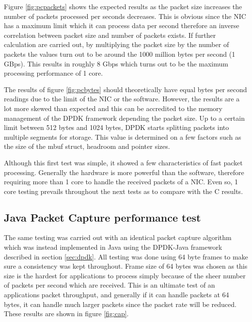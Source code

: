 \documentclass[final_report.tex]{subfiles}
\begin{document}
Figure \ref{fig:pcpackets} shows the expected results as the packet size increases the number of packets processed per seconds decreases. This is obvious since the NIC has a maximum limit which it can process data per second therefore an inverse correlation between packet size and number of packets exists. If further calculation are carried out, by multiplying the packet size by the number of packets the values turn out to be around the 1000 million bytes per second (1 GBps). This results in roughly 8 Gbps which turns out to be the maximum processing performance of 1 core.

The results of figure \ref{fig:pcbytes} should theoretically have equal bytes per second readings due to the limit of the NIC or the software. However, the results are a lot more skewed than expected and this can be accredited to the memory management of the DPDK framework depending the packet size. Up to a certain limit between 512 bytes and 1024 bytes, DPDK starts splitting packets into multiple segments for storage. This value is determined on a few factors such as the size of the mbuf struct, headroom and pointer sizes.

Although this first test was simple, it showed a few characteristics of fast packet processing. Generally the hardware is more powerful than the software, therefore requiring more than 1 core to handle the received packets of a NIC. Even so, 1 core testing prevails throughout the next tests as to compare with the C results.

\subsection{Java Packet Capture performance test}
The same testing was carried out with an identical packet capture algorithm which was instead implemented in Java using the DPDK-Java framework described in section \ref{sec:dpdk}. All testing was done using 64 byte frames to make sure a consistency was kept throughout. Frame size of 64 bytes was chosen as this size is the hardest for applications to process simply because of the sheer number of packets per second which are received. This is an ultimate test of an applications packet throughput, and generally if it can handle packets at 64 bytes, it can handle much larger packets since the packet rate will be reduced. These results are shown in figure \ref{fig:cap}.
\end{document}
